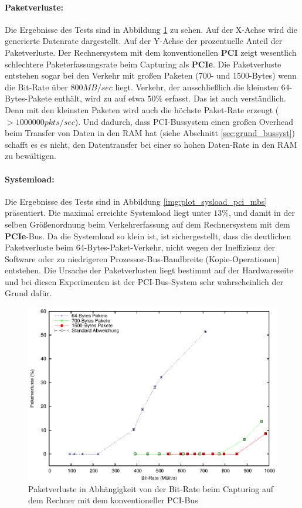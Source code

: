 \paragraph*{Paketverluste:}
Die Ergebnisse des Tests sind in Abbildung \ref{img:plot_pktlos_pci_mbs} zu
sehen. Auf der X-Achse wird die generierte Datenrate dargestellt. Auf der
Y-Achse der prozentuelle Anteil der Paketverluste. Der Rechnersystem mit dem
konventionellen \textbf{PCI} zeigt wesentlich schlechtere Paketerfassungsrate
beim Capturing als \textbf{PCIe}. Die Paketverluste entstehen sogar bei den
Verkehr mit großen Paketen (700- und 1500-Bytes) wenn die Bit-Rate über $800
MB/sec$ liegt. Verkehr, der ausschließlich die kleinsten 64-Bytes-Pakete
enthält, wird zu auf etwa $50\%$ erfasst. Das ist auch verständlich. Denn mit
den kleinsten Paketen wird auch die höchste Paket-Rate erzeugt ($>1000000
pkts/sec$).  Und dadurch, dass PCI-Bussystem einen großen Overhead beim
Transfer von Daten in den RAM hat (siehe Abschnitt \ref{sec:grund_bussyst})
schafft es es nicht, den Datentransfer bei einer so hohen Daten-Rate in den RAM
zu bewältigen.

\paragraph*{Systemload:}
Die Ergebnisse des Tests sind in Abbildung \ref{img:plot_sysload_pci_mbs}
präsentiert.  Die maximal erreichte Systemload liegt unter $13\%$, und damit in
der selben Größenordnung beim Verkehrerfassung auf dem Rechnersystem mit dem
\textbf{PCIe}-Bus. Da die Systemload so klein ist, ist sichergestellt, dass die
deutlichen Paketverluste beim 64-Bytes-Paket-Verkehr, nicht wegen der
Ineffizienz der Software oder zu niedrigeren Prozessor-Bus-Bandbreite
(Kopie-Operationen) entstehen.  Die Ursache der Paketverlusten liegt bestimmt
auf der Hardwareseite und bei diesen Experimenten ist der PCI-Bus-System sehr
wahrscheinlich der Grund dafür.
\begin{figure} 
\centering \includegraphics[width=5.5in]{plots/graphs/pktloss_PCI_mbs.eps}
\caption{Paketverluste in Abhängigkeit von der Bit-Rate beim Capturing auf dem Rechner mit dem konventioneller PCI-Bus}
\label{img:plot_pktlos_pci_mbs}
\end{figure}

